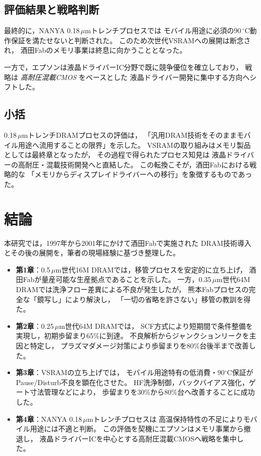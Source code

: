 \documentclass[conference]{IEEEtran}
\begin{document}
\subsection{評価結果と戦略判断}
最終的に，NANYA 0.18\,$\mu$mトレンチプロセスでは
モバイル用途に必須の90\,$^\circ$C動作保証を満たせないと判断された。
このため次世代VSRAMへの展開は断念され，
酒田Fabのメモリ事業は終息に向かうこととなった。

一方で，エプソンは液晶ドライバーIC分野で既に競争優位を確立しており，
戦略は \emph{高耐圧混載CMOS} をベースとした
液晶ドライバー開発に集中する方向へシフトした。

\subsection{小括}
0.18\,$\mu$mトレンチDRAMプロセスの評価は，
「汎用DRAM技術をそのままモバイル用途へ流用することの限界」を示した。
VSRAMの取り組みはメモリ製品としては最終章となったが，
その過程で得られたプロセス知見は
液晶ドライバーの高耐圧・混載技術開発へと直結した。
この転換こそが，酒田Fabにおける戦略的な
「メモリからディスプレイドライバーへの移行」を象徴するものであった。

\section{結論}

本研究では，1997年から2001年にかけて酒田Fabで実施された
DRAM技術導入とその後の展開を，筆者の現場経験に基づき整理した。

\begin{itemize}
  \item \textbf{第1章}：0.5\,$\mu$m世代16M DRAMでは，移管プロセスを安定的に立ち上げ，
        酒田Fabが量産可能な生産拠点であることを示した。
        一方，0.35\,$\mu$m世代64M DRAMでは洗浄フロー差異による不良が発生したが，
        熊本Fabプロセスの完全な「鏡写し」により解決し，
        「一切の省略を許さない」移管の教訓を得た。
  \item \textbf{第2章}：0.25\,$\mu$m世代64M DRAMでは，
        SCF方式により短期間で条件整備を実現し，初期歩留まり65\%に到達。
        不良解析からジャンクションリークを主因と特定し，
        プラズマダメージ対策により歩留まりを80\%台後半まで改善した。
  \item \textbf{第3章}：VSRAMの立ち上げでは，
        モバイル用途特有の低消費・90$^\circ$C保証が
        Pause/Disturb不良を顕在化させた。
        HF洗浄制御，バックバイアス強化，ゲート寸法管理などにより，
        歩留まりを30\%から80\%台へ改善することに成功した。
  \item \textbf{第4章}：NANYA 0.18\,$\mu$mトレンチプロセスは
        高温保持特性の不足によりモバイル用途には不適と判断。
        この評価を契機にエプソンはメモリ事業から撤退し，
        液晶ドライバーICを中心とする高耐圧混載CMOSへ戦略を集中した。
\end{itemize}
\end{document}
